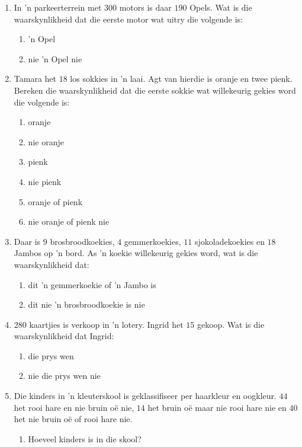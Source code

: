 \begin{eocexercises}{}
\begin{enumerate}[itemsep=5pt, label=\textbf{\arabic*}.]
  \item In 'n parkeerterrein met $300$ motors is daar $190$ Opels. Wat is die waarskynlikheid dat die eerste motor wat uitry die volgende is:
    \begin{enumerate}[noitemsep, label=\textbf{(\alph*)} ]
    \item 'n Opel
    \item nie 'n Opel nie
    \end{enumerate}
  \item Tamara het $18$ los sokkies in 'n laai. Agt van hierdie is oranje en twee pienk. Bereken die waarskynlikheid dat die eerste sokkie wat willekeurig gekies word die volgende is:
    \begin{enumerate}[noitemsep, label=\textbf{(\alph*)} ]
    \item oranje
    \item nie oranje
    \item pienk
    \item nie pienk
    \item oranje of pienk
    \item nie oranje of pienk nie
    \end{enumerate}
  \item Daar is $9$ brosbroodkoekies, $4$ gemmerkoekies,
    $11$ sjokoladekoekies en $18$ Jambos op 'n bord. As 'n koekie willekeurig gekies word, wat is die waarskynlikheid dat:
    \begin{enumerate}[noitemsep, label=\textbf{(\alph*)} ]
    \item dit 'n gemmerkoekie of 'n Jambo is
    \item dit nie 'n brosbroodkoekie is nie
    \end{enumerate}
  \item $280$ kaartjies is verkoop in 'n lotery. Ingrid het $15$ gekoop. Wat is die waarskynlikheid dat Ingrid:
    \begin{enumerate}[noitemsep, label=\textbf{(\alph*)} ]
    \item die prys wen
    \item nie die prys wen nie
    \end{enumerate}
  \item Die kinders in 'n kleuterskool is geklassifiseer per haarkleur en oogkleur. $44$ het rooi hare en nie bruin o\"e nie, $14$ het bruin o\"e maar nie rooi hare nie en $40$ het nie bruin o\"e of rooi hare nie.
    \begin{enumerate}[noitemsep, label=\textbf{(\alph*)} ]
    \item Hoeveel kinders is in die skool?

\end{enumerate}
\end{enumerate}
\end{eocexercises}
